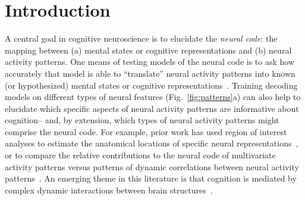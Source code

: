 \documentclass[english]{article}
\begin{document}
\section*{Introduction}
A central goal in cognitive neuroscience is to elucidate the
\textit{neural code}: the mapping between (a) mental states or
cognitive representations and (b) neural activity patterns. One means
of testing models of the neural code is to ask how accurately that
model is able to ``translate'' neural activity patterns into known (or
hypothesized) mental states or cognitive
representations~\citep[e.g.,][]{HaxbEtal01, NormEtal06, TongPrat12,
  MitcEtal08a, KamiTong05, NishEtal11, PereEtal18, HuthEtal12,
  HuthEtal16}.  Training decoding models on different types of neural
features (Fig.~\ref{fig:patterns}a) can also help to elucidate which
specific aspects of neural activity patterns are informative about
cognition-- and, by extension, which types of neural activity patterns
might comprise the neural code.  For example, prior work has used
region of interest analyses to estimate the anatomical locations of
specific neural representations~\citep[e.g.,][]{EtzeEtal09}, or to
compare the relative contributions to the neural code of multivariate
activity patterns versus patterns of dynamic correlations between
neural activity patterns~\citep[e.g.,][]{MannEtal18, FongEtal19}.  An
emerging theme in this literature is that cognition is mediated by
complex dynamic interactions between brain
structures~\citep{SporHone06, BassEtal06, Turk13, DemeEtal19}.
\end{document}
